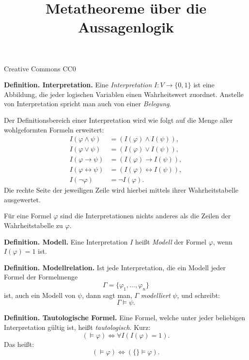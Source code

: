 \documentclass{beamer}
\title{Metatheoreme über die Aussagenlogik}
\date{}
\newcommand{\modest}[1]{{\small\color{gray}#1}}
\newcommand{\strong}[1]{\textsf{\textbf{#1}}}
\begin{document}
\begin{frame}
\maketitle
\vfill\hfill
\modest{Creative Commons CC0}
\end{frame}

\begin{frame}
\strong{Definition. Interpretation.}
Eine \emph{Interpretation} $I\colon V\to\{0,1\}$ ist eine Abbildung,
die jeder logischen Variablen einen Wahrheitswert zuordnet.
Anstelle von Interpretation spricht man auch von einer \emph{Belegung}.
\end{frame}

\begin{frame}
Der Definitionsbereich einer Interpretation wird wie folgt
auf die Menge aller wohlgeformten Formeln erweitert:
\begin{align*}
I(\varphi\land\psi) &= (I(\varphi)\land I(\psi)),\\
I(\varphi\lor\psi) &= (I(\varphi)\lor I(\psi)),\\
I(\varphi\rightarrow\psi) &= (I(\varphi)\rightarrow I(\psi)),\\
I(\varphi\leftrightarrow\psi) &= (I(\varphi)\leftrightarrow I(\psi)),\\
I(\neg\varphi) &= \neg I(\varphi).
\end{align*}
Die rechte Seite der jeweiligen Zeile wird hierbei mittels ihrer
Wahrheitstabelle ausgewertet.
\end{frame}

\begin{frame}
Für eine Formel $\varphi$ sind die Interpretationen
nichts anderes als die Zeilen der Wahrheitstabelle zu $\varphi$.
\end{frame}

\begin{frame}
\strong{Definition. Modell.} Eine Interpretation $I$
heißt \emph{Modell} der Formel $\varphi$, wenn
$I(\varphi)=1$ ist.
\end{frame}

\begin{frame}
\strong{Definition. Modellrelation.}
Ist jede Interpretation, die ein Modell jeder Formel der Formelmenge
\[\Gamma=\{\varphi_1,\ldots,\varphi_n\}\]
ist, auch ein Modell von $\psi$, dann sagt man,
$\Gamma$ \emph{modelliert} $\psi$, und schreibt:
\[\Gamma\models\psi.\]
\end{frame}

\begin{frame}
\strong{Definition. Tautologische Formel.}
Eine Formel, welche unter jeder beliebigen Interpretation
gültig ist, heißt \emph{tautologisch}. Kurz:
\[(\models\varphi) \iff \forall I(I(\varphi)=1).\]
Das heißt:
\[(\models\varphi) \iff (\{\}\models\varphi).\]
\end{frame}
\end{document}

